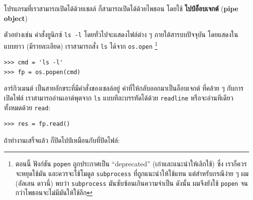 
โปรแกรมที่เราสามารถเปิดได้ด้วยเชลล์ ก็สามารถเปิดได้ด้วยไพธอน โดยใช้ \textbf{ไปป์อ็อบเจกต์} (\textbf{pipe object})



ตัวอย่างเช่น คำสั่งยูนิกซ์ \texttt{ls -l} โดยทั่วไปจะแสดงไฟล์ต่าง ๆ ภายใต้สารบบปัจจุบัน โดยแสดงในแบบยาว (มีรายละเอียด)
เราสามารถสั่ง \texttt{ls} ได้จาก \texttt{os.open}%
\footnote{ตอนนี้ ฟังก์ชัน \texttt{popen} ถูกประกาศเป็น ``deprecated'' (เก่าและแนะนำให้เลิกใช้)
ซึ่ง เราก็ควรจะหยุดใช้มัน และควรจะใช้โมดูล \texttt{subprocess} ที่ถูกแนะนำให้ใช้แทน
แต่สำหรับกรณีง่าย ๆ ผม (อัลเลน ดาวนี่) พบว่า \texttt{subprocess} มันซับซ้อนเกินความจำเป็น
ดังนั้น ผมจึงยังใช้ \texttt{popen} จนกว่าไพธอนจะไม่มีมันให้ใช้อีก}%


\begin{verbatim}
>>> cmd = 'ls -l'
>>> fp = os.popen(cmd)
\end{verbatim}
%
%
อาร์กิวเมนต์ เป็นสายอักขระที่มีคำสั่งของเชลล์อยู่
ค่าที่ให้กลับออกมาเป็นอ็อบเจกต์ ที่คล้าย ๆ กับการเปิดไฟล์
เราสามารถอ่านเอาต์พุตจาก \texttt{ls} แบบทีละบรรทัดได้ด้วย \texttt{readline}
หรือจะอ่านทีเดียวทั้งหมดด้วย \texttt{read}:


\begin{verbatim}
>>> res = fp.read()
\end{verbatim}
%
%
ถ้าทำงานเสร็จแล้ว ก็ปิดไปป์เหมือนกับที่ปิดไฟล์:


